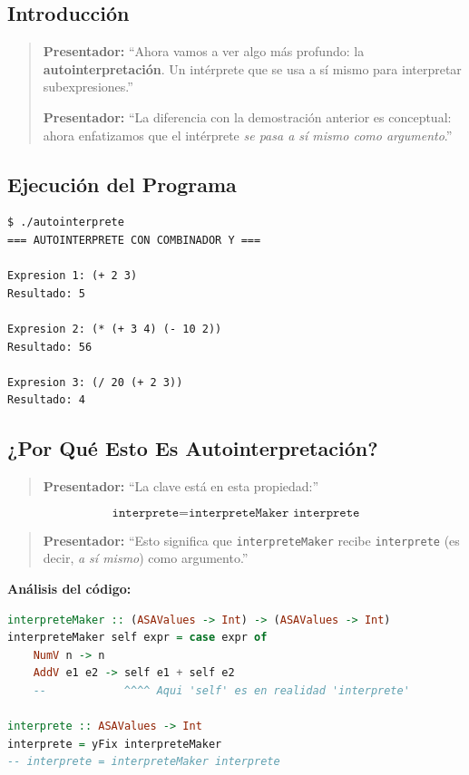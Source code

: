 \documentclass[12pt]{article}
\begin{document}
\subsection*{Introducción}

\begin{quote}
\textbf{Presentador:} ``Ahora vamos a ver algo más profundo: la \textbf{autointerpretación}. Un intérprete que se usa a sí mismo para interpretar subexpresiones.''

\textbf{Presentador:} ``La diferencia con la demostración anterior es conceptual: ahora enfatizamos que el intérprete \textit{se pasa a sí mismo como argumento}.''
\end{quote}

\subsection*{Ejecución del Programa}

\begin{verbatim}
$ ./autointerprete
=== AUTOINTERPRETE CON COMBINADOR Y ===

Expresion 1: (+ 2 3)
Resultado: 5

Expresion 2: (* (+ 3 4) (- 10 2))
Resultado: 56

Expresion 3: (/ 20 (+ 2 3))
Resultado: 4
\end{verbatim}

\subsection*{¿Por Qué Esto Es Autointerpretación?}

\begin{quote}
\textbf{Presentador:} ``La clave está en esta propiedad:''
\end{quote}

\begin{equation*}
\texttt{interprete} = \texttt{interpreteMaker interprete}
\end{equation*}

\begin{quote}
\textbf{Presentador:} ``Esto significa que \texttt{interpreteMaker} recibe \texttt{interprete} (es decir, \textit{a sí mismo}) como argumento.''
\end{quote}

\textbf{Análisis del código:}

\begin{lstlisting}[language=Haskell, caption=Autointérprete]
interpreteMaker :: (ASAValues -> Int) -> (ASAValues -> Int)
interpreteMaker self expr = case expr of
    NumV n -> n
    AddV e1 e2 -> self e1 + self e2
    --            ^^^^ Aqui 'self' es en realidad 'interprete'

interprete :: ASAValues -> Int
interprete = yFix interpreteMaker
-- interprete = interpreteMaker interprete
\end{lstlisting}
\end{document}

